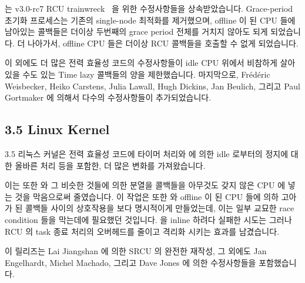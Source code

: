  는 v3.0-rc7 RCU
trainwreck~\cite{PaulEMcKenney2011RCU3.0trainwreck} 을 위한 
수정사항들을 상속받았습니다.
Grace-period 초기화 프로세스는 기존의 single-node 최적화를 제거했으며, offline
이 된 CPU 들에 남아있는 콜백들은 더이상 두번째의 grace period 전체를 거치지
않아도 되게 되었습니다.
더 나아가서, offline CPU 들은 더이상 RCU 콜백들을 호출할 수 없게 되었습니다.

이 외에도 더 많은 전력 효율성 코드의 수정사항들이 idle CPU 위에서 비참하게
살아있을 수도 있는 Time lazy 콜백들의 양을 제한했습니다.
마지막으로, Fr\'ed\'eric Weisbecker, Heiko Carstens, Julia Lawall, Hugh
Dickins, Jan Beulich, 그리고 Paul Gortmaker 에 의해서 다수의 수정사항들이
추가되었습니다.

\subsection{3.5 Linux Kernel}

3.5 리눅스 커널은  전력 효율성 코드에 타이머 처리와
 에 의한 idle 로부터의 정지에 대한 올바른 처리 등을 포함한, 더
많은 변화를 가져왔습니다.

이는 또한  와 그 비슷한 것들에 의한 분열을 콜백들을 아무것도
갖지 않은 CPU 에 넣는 것을 막음으로써 줄였습니다.
이 작업은 또한  와 offline 이 된 CPU 들에 의하 고아가 된
콜백들 사이의 상호작용을 보다 명시적이게 만들었는데, 이는 일부 교묘한 race
condition 들을 막는데에 필요했던 것입니다.
 을 inline 하려다 실패한 시도는 그러나 RCU 의 task 종료
처리의 오버헤드를 줄이고 격리화 시키는 효과를 남겼습니다.

이 릴리즈는 Lai Jiangshan 에 의한 SRCU 의 완전한 재작성, 그 외에도 Jan
Engelhardt, Michel Machado, 그리고 Dave Jones 에 의한 수정사항들을
포함했습니다.
\iffalse

